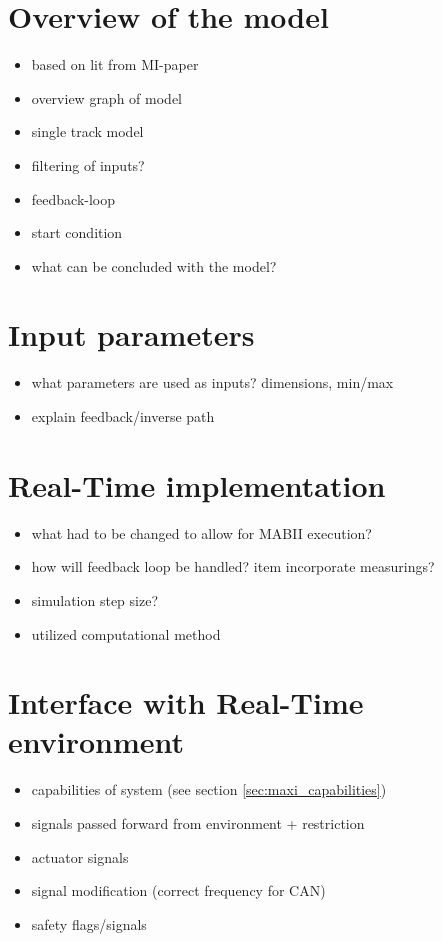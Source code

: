 \documentclass[ExampleMasters.tex]{subfiles}
\begin{document}
\section{Overview of the model}
\label{sec:overview_of_the_model}
			
\begin{itemize}
	\item based on lit from MI-paper 
	\item overview graph of model
	\item single track model
	
	\item filtering of inputs?
	\item feedback-loop
	\item start condition
	\item what can be concluded with the model?
\end{itemize}

\section{Input parameters}
\label{sec:input_parameters}

\begin{itemize}
	\item what parameters are used as inputs? dimensions, min/max
	\item explain feedback/inverse path
	
\end{itemize}

\section{Real-Time implementation}
\label{sec:real_time_implementation}

\begin{itemize}
	\item what had to be changed to allow for MABII execution?
	\item how will feedback loop be handled?
	item incorporate measurings?
	\item simulation step size?
	\item utilized computational method
\end{itemize}

\section{Interface with Real-Time environment}
\label{sec:interface_with_real_time}

\begin{itemize}
	\item capabilities of system (see section \ref{sec:maxi_capabilities})
	\item signals passed forward from environment + restriction
	
	\item actuator signals
	\item signal modification (correct frequency for CAN)
	\item safety flags/signals
	
\end{itemize}
\end{document}
